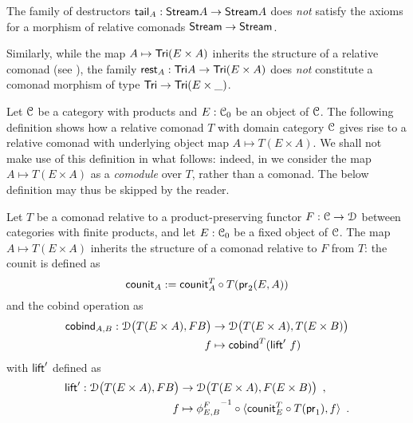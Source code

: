 \documentclass[a4paper,USenglish]{lipics}
\begin{document}
\begin{Long}

\begin{rem}
 The family of destructors $\stail_A : \stream A \to \stream A$  
 does \emph{not} satisfy the axioms for a morphism of relative comonads $\stream\to\stream$.
 
 Similarly, while the map $A \mapsto \Tri(E\times A)$ inherits the structure of a relative comonad (see ),
 the family $\tail_A : \Tri A \to \Tri(E \times A)$  does \emph{not} constitute a comonad morphism
 of type $\Tri \to \Tri(E \times \_)$.
\end{rem}

Let $\C$ be a category with products and $E:\C_0$ be an object of $\C$.
The following definition shows how a relative comonad $T$ with domain category $\C$ gives rise to a relative comonad with underlying object map
$A \mapsto T(E\times A)$.
We shall not make use of this definition in what follows: indeed, in  we consider the map $A\mapsto T(E\times A)$
as a \emph{comodule} over $T$, rather than a comonad. The below definition may thus be skipped by the reader.

\begin{defn}\label{product_comonad}
  Let $T$ be a comonad relative to a product-preserving functor $F:\C\to\D$ between categories with finite products,
  and let $E:\C_0$ be a fixed object of $\C$.
 The map $A\mapsto T(E\times A)$ inherits the structure of a comonad relative to $F$ from $T$: the 
 counit is defined as
   \[ \counit_A := \comp{T(\pr_2(E,A))}{\counit^T_{A}} \]
  and the cobind operation as
   \begin{align*} 
            \cobind_{A,B} : \D\bigl(T(E\times A),FB\bigr) &\to \D\bigl(T(E\times A),T(E\times B)\bigr) \\
              f &\mapsto  \cobind^T(\extend'~f)
   \end{align*}
  with $\extend'$ defined as 
  \begin{align*} \extend' : \D\bigl(T(E\times A),FB\bigr) &\to \D\bigl(T(E\times A), F(E\times B)\bigr) \enspace , \\ 
                                            f & \mapsto \comp{\langle \comp{T(\pr_1)}{\counit^T_E}, f \rangle}{{\phi^{F}_{E,B}}^{-1}} \enspace .
  \end{align*}
\end{defn}

\end{Long}
\end{document}
